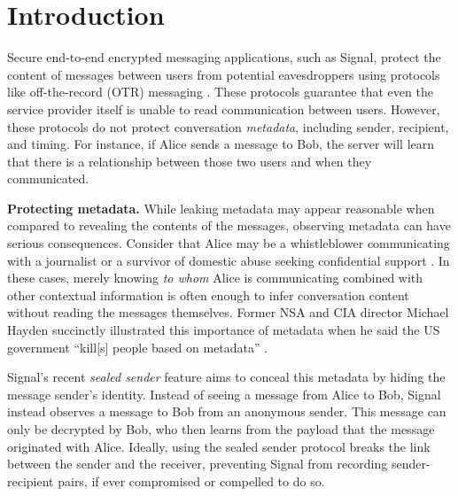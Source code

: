 \section{Introduction} %

Secure end-to-end encrypted messaging applications, such as Signal,
protect the content of messages between users from potential eavesdroppers using
protocols like off-the-record (OTR) messaging \cite{BGB04,
DiRaimondo:2005:SOM:1102199.1102216}. These protocols guarantee that even the
service provider itself is unable to read communication between users. However,
these protocols do not protect conversation \emph{metadata}, including sender,
recipient, and timing.  For instance, if Alice sends a message to Bob, the
server will learn that there is a relationship between those two users and when
they communicated.

\medskip
\noindent
\textbf{Protecting metadata.} While leaking metadata may appear reasonable when compared to revealing the contents of the messages,
observing metadata can have serious consequences. Consider that Alice may be a whistleblower communicating with a journalist
\cite{190976} or a survivor of domestic abuse seeking confidential support
\cite{236244}. In these cases, merely knowing \emph{to whom} Alice is communicating combined with other contextual information is often enough to infer
conversation content without reading the messages themselves. Former NSA and CIA director Michael Hayden succinctly illustrated this importance of metadata when he said the US government ``kill[s] people based on metadata'' \cite{haydenmetadata}.


Signal's recent \emph{sealed
sender} feature aims to conceal this metadata by hiding the message sender's identity.
Instead of seeing a message from Alice to
Bob, Signal instead observes a message to Bob from an anonymous sender. This message
can only be decrypted by Bob, who then learns from the payload that the message
originated with Alice. Ideally, using the sealed sender protocol breaks the link
between the sender and the receiver, preventing Signal from recording 
sender-recipient pairs, if ever compromised or compelled to do so.

